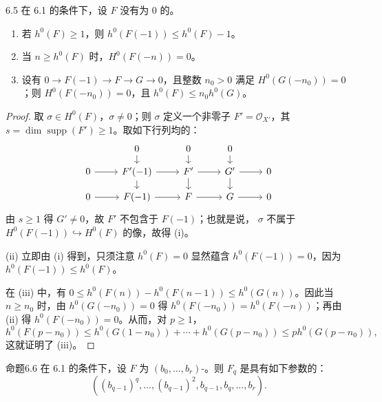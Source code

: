 \begin{SGAresult}{}{6.5}
在 6.1 的条件下，设 $F$ 没有为 $0$ 的。
\begin{enumerate}
\item[(i)] 若 $h^0(F)\geq1$，则 $h^0(F(-1))\leq h^0(F)-1$。
\item[(ii)] 当 $n\geq h^0(F)$ 时，$H^0(F(-n))=0$。
\item[(iii)] 设有 $0\to F(-1)\to F\to G\to0$，且整数 $n_0>0$ 满足 $H^0(G(-n_0))=0$；则 $H^0(F(-n_0))=0$，且 $h^0(F)\leq n_0h^0(G)$。
\end{enumerate}
\end{SGAresult}
\begin{proof}
取 $\sigma\in H^0(F)$，$\sigma\neq0$；则 $\sigma$ 定义一个非零子 $F'=\mathscr O_{X'}$，其 $s=\dim\operatorname{supp}(F')\geq1$。取如下行列均的：
\[
\begin{tikzcd}[row sep=small]
&0\arrow[d]&0\arrow[d]&0\arrow[d]&\\
0\arrow[r]&F'(-1)\arrow[r]\arrow[d]&F'\arrow[r]\arrow[d]&G'\arrow[r]\arrow[d]&0\\
0\arrow[r]&F(-1)\arrow[r]&F\arrow[r]&G\arrow[r]&0
\end{tikzcd}
\]
由 $s\geq1$ 得 $G'\neq0$，故 $F'$ 不包含于 $F(-1)$；也就是说， $\sigma$ 不属于 $H^0(F(-1))\hookrightarrow H^0(F)$ 的像，故得 (i)。

(ii) 立即由 (i) 得到，只须注意 $h^0(F)=0$ 显然蕴含 $h^0(F(-1))=0$，因为 $h^0(F(-1))\leq h^0(F)$。

在 (iii) 中，有 $0\leq h^0(F(n))-h^0(F(n-1))\leq h^0(G(n))$。因此当 $n\geq n_0$ 时，由 $h^0(G(-n_0))=0$ 得 $h^0(F(-n_0))=h^0(F(-n))$；再由 (ii) 得 $h^0(F(-n_0))=0$。从而，对 $p\geq1$，
\[h^0(F(p-n_0))\leq h^0(G(1-n_0))+\cdots+h^0(G(p-n_0))\leq p h^0(G(p-n_0)),\]
这就证明了 (iii)。
\end{proof}
\begin{SGAresult}{命题}{6.6}
在 6.1 的条件下，设 $F$ 为 $(b_0,\ldots,b_r)$-。则 $F_q$ 是具有如下参数的：
\[((b_{q-1})^q,\ldots,(b_{q-1})^2,b_{q-1},b_q,\ldots,b_r).\]
\end{SGAresult}
